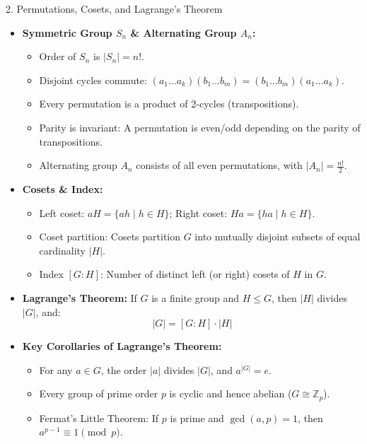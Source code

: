 \documentclass[11pt,a4paper]{article}
\begin{document}
\begin{defbox}{2. Permutations, Cosets, and Lagrange's Theorem}
\begin{itemize}
    \item \textbf{Symmetric Group $S_n$ \& Alternating Group $A_n$:}
    \begin{itemize}
        \item Order of $S_n$ is $|S_n| = n!$.
        \item Disjoint cycles commute: $(a_1 \dots a_k)(b_1 \dots b_m) = (b_1 \dots b_m)(a_1 \dots a_k)$.
        \item Every permutation is a product of 2-cycles (transpositions).
        \item Parity is invariant: A permutation is even/odd depending on the parity of transpositions.
        \item Alternating group $A_n$ consists of all even permutations, with $|A_n| = \frac{n!}{2}$.
    \end{itemize}
    \item \textbf{Cosets \& Index:}
    \begin{itemize}
        \item Left coset: $aH = \{ah \mid h \in H\}$; Right coset: $Ha = \{ha \mid h \in H\}$.
        \item Coset partition: Cosets partition $G$ into mutually disjoint subsets of equal cardinality $|H|$.
        \item Index $[G : H]$: Number of distinct left (or right) cosets of $H$ in $G$.
    \end{itemize}
    \item \textbf{Lagrange's Theorem:} If $G$ is a finite group and $H \le G$, then $|H|$ divides $|G|$, and:
    \begin{equation*}
        |G| = [G : H] \cdot |H|
    \end{equation*}
    \item \textbf{Key Corollaries of Lagrange's Theorem:}
    \begin{itemize}
        \item For any $a \in G$, the order $|a|$ divides $|G|$, and $a^{|G|} = e$.
        \item Every group of prime order $p$ is cyclic and hence abelian ($G \cong \mathbb{Z}_p$).
        \item Fermat's Little Theorem: If $p$ is prime and $\gcd(a, p) = 1$, then $a^{p-1} \equiv 1 \pmod p$.
    \end{itemize}
\end{itemize}
\end{defbox}
\end{document}

